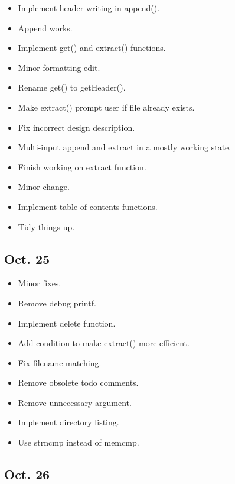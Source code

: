 \documentclass[12pt,letterpaper]{article}
\begin{document}
\begin{itemize}
	\item Implement header writing in append().
	\item Append works.
	\item Implement get() and extract() functions.
	\item Minor formatting edit.
	\item Rename get() to getHeader().
	\item Make extract() prompt user if file already exists.
	\item Fix incorrect design description.
	\item Multi-input append and extract in a mostly working state.
	\item Finish working on extract function.
	\item Minor change.
	\item Implement table of contents functions.
	\item Tidy things up.
\end{itemize}

\subsection*{Oct. 25}

\begin{itemize}
	\item Minor fixes.
	\item Remove debug printf.
	\item Implement delete function.
	\item Add condition to make extract() more efficient.
	\item Fix filename matching.
	\item Remove obsolete todo comments.
	\item Remove unnecessary argument.
	\item Implement directory listing.
	\item Use strncmp instead of memcmp.
\end{itemize}

\subsection*{Oct. 26}
\end{document}
